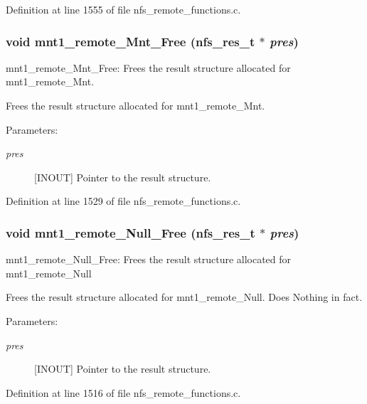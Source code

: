 Definition at line 1555 of file nfs\_\-remote\_\-functions.c.
\subsubsection{\setlength{\rightskip}{0pt plus 5cm}void mnt1\_\-remote\_\-Mnt\_\-Free (nfs\_\-res\_\-t $\ast$ {\em pres})}\label{group__NFSprocs_ga42}


mnt1\_\-remote\_\-Mnt\_\-Free: Frees the result structure allocated for mnt1\_\-remote\_\-Mnt.

Frees the result structure allocated for mnt1\_\-remote\_\-Mnt.

\begin{Desc}
\item[Parameters:]
\begin{description}
\item[{\em pres}][INOUT] Pointer to the result structure. \end{description}
\end{Desc}


Definition at line 1529 of file nfs\_\-remote\_\-functions.c.
\subsubsection{\setlength{\rightskip}{0pt plus 5cm}void mnt1\_\-remote\_\-Null\_\-Free (nfs\_\-res\_\-t $\ast$ {\em pres})}\label{group__NFSprocs_ga45}


mnt1\_\-remote\_\-Null\_\-Free: Frees the result structure allocated for mnt1\_\-remote\_\-Null

Frees the result structure allocated for mnt1\_\-remote\_\-Null. Does Nothing in fact.

\begin{Desc}
\item[Parameters:]
\begin{description}
\item[{\em pres}][INOUT] Pointer to the result structure. \end{description}
\end{Desc}


Definition at line 1516 of file nfs\_\-remote\_\-functions.c.
